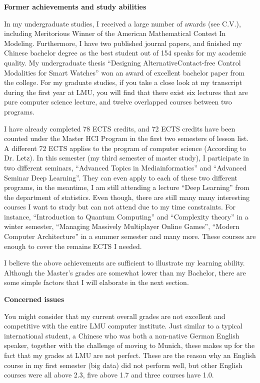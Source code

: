 \documentclass[11pt,a4paper,sans]{moderncv}        %
\begin{document}
\textbf{Former achievements and study abilities}

In my undergraduate studies, I received a large number of awards (see C.V.), including Meritorious Winner of the American Mathematical Contest In Modeling. Furthermore, I have two published journal papers, and finished my Chinese bachelor degree as the best student out of 154 speaks for my academic quality. My undergraduate thesis ``Designing AlternativeContact-free Control Modalities for Smart Watches'' won an award of excellent bachelor paper from the college.
For my graduate studies, if you take a close look at my transcript during the first year at LMU, you will find that there exist six lectures that are pure computer science lecture, and twelve overlapped courses between two programs.

I have already completed 78 ECTS credits, and 72 ECTS credits have been counted under the Master HCI Program in the first two semesters of lesson list. A different 72 ECTS applies to the program of computer science (According to Dr. Letz). 
In this semester (my third semester of master study), I participate in two different seminars, ``Advanced Topics in Mediainformatics'' and ``Advanced Seminar Deep Learning''. They can even apply to each of these two different programs, in the meantime, I am still attending a lecture ``Deep Learning'' from the department of statistics. Even though, there are still many many interesting courses I want to study but can not attend due to my time constraints. For instance, ``Introduction to Quantum Computing'' and ``Complexity theory'' in a winter semester, ``Managing Massively Multiplayer Online Games'', ``Modern Computer Architecture'' in a summer semester and many more. These courses are enough to cover the remains ECTS I needed.

I believe the above achievements are sufficient to illustrate my learning ability. Although the Master's grades are somewhat lower than my Bachelor, there are some simple factors that I will elaborate in the next section.

\textbf{Concerned issues}

You might consider that my current overall grades are not excellent and competitive with the entire LMU computer institute. Just similar to a typical international student, a Chinese who was both a non-native German English speaker, together with the challenge of moving to Munich, these makes up for the fact that my grades at LMU are not perfect. These are the reason why an English course in my first semester (big data) did not perform well, but other English courses were all above 2.3, five above 1.7 and three courses have 1.0.
\end{document}
